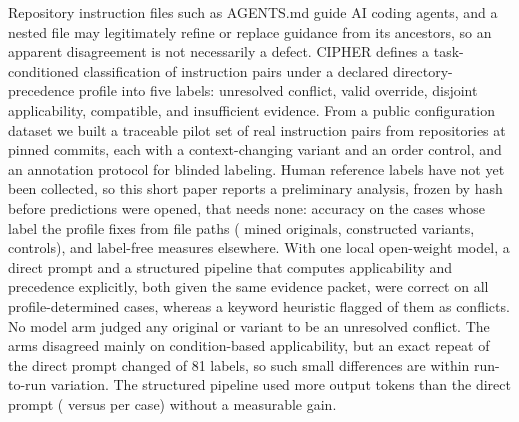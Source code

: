 Repository instruction files such as AGENTS.md guide AI coding agents, and a nested file may legitimately refine or
replace guidance from its ancestors, so an apparent disagreement is not necessarily a defect. CIPHER defines a
task-conditioned classification of instruction pairs under a declared directory-precedence profile into five labels:
unresolved conflict, valid override, disjoint applicability, compatible, and insufficient evidence. From a public
configuration dataset we built a traceable pilot set of \NOriginals{} real instruction pairs from \NEvalReposWord{}
repositories at pinned commits, each with a context-changing variant and an order control, and an annotation protocol
for blinded labeling. Human reference labels have not yet been collected, so this short paper reports a preliminary
analysis, frozen by hash before predictions were opened, that needs none: accuracy on the \NPD{} cases whose label the
profile fixes from file paths (\NPDOrig{} mined originals, \NPDVar{} constructed variants, \NPDCtrl{} controls), and
label-free measures elsewhere. With one local open-weight model, a direct prompt and a structured pipeline that
computes applicability and precedence explicitly, both given the same evidence packet, were correct on all \NPD{}
profile-determined cases, whereas a keyword heuristic flagged \BZeroPDFalseConf{} of them as conflicts. No model arm
judged any original or variant to be an unresolved conflict. The arms disagreed mainly on condition-based
applicability, but an exact repeat of the direct prompt changed \RepeatDiffTotal{} of 81 labels, so such small
differences are within run-to-run variation. The structured pipeline used more output tokens than the direct prompt
(\BTwoMeanOut{} versus \BOneMeanOut{} per case) without a measurable gain.
